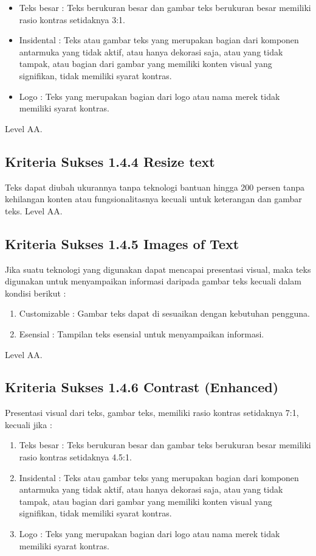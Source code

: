 \begin{itemize}
	\item Teks besar : Teks berukuran besar dan gambar teks berukuran besar memiliki rasio kontras setidaknya 3:1.
	\item Insidental : Teks atau gambar teks yang merupakan bagian dari komponen antarmuka yang tidak aktif, atau hanya dekorasi saja, atau yang tidak tampak, atau bagian dari gambar yang memiliki konten visual yang signifikan, tidak memiliki syarat kontras.
	\item Logo : Teks yang merupakan bagian dari logo atau nama merek tidak memiliki syarat kontras.
\end{itemize}

Level AA.

\subsection{Kriteria Sukses 1.4.4 Resize text}
\label{sec:kriteria_1.4.4}
Teks dapat diubah ukurannya tanpa teknologi bantuan hingga 200 persen tanpa kehilangan konten atau fungsionalitasnya kecuali untuk keterangan dan gambar teks.
Level AA.

\subsection{Kriteria Sukses 1.4.5 Images of Text}
\label{sec:kriteria_1.4.5}
Jika suatu teknologi yang digunakan dapat mencapai presentasi visual, maka teks digunakan untuk menyampaikan informasi daripada gambar teks kecuali dalam kondisi berikut :

\begin{enumerate}
	\item Customizable : Gambar teks dapat di sesuaikan dengan kebutuhan pengguna.
	\item Esensial : Tampilan teks esensial untuk menyampaikan informasi.
\end{enumerate}

Level AA.

\subsection{Kriteria Sukses 1.4.6 Contrast (Enhanced)}
\label{sec:kriteria_1.4.6}
Presentasi visual dari teks, gambar teks, memiliki rasio kontras setidaknya 7:1, kecuali jika :

\begin{enumerate}
	\item Teks besar : Teks berukuran besar dan gambar teks berukuran besar memiliki rasio kontras setidaknya 4.5:1.
	\item Insidental : Teks atau gambar teks yang merupakan bagian dari komponen antarmuka yang tidak aktif, atau hanya dekorasi saja, atau yang tidak tampak, atau bagian dari gambar yang memiliki konten visual yang signifikan, tidak memiliki syarat kontras.
	\item Logo : Teks yang merupakan bagian dari logo atau nama merek tidak memiliki syarat kontras.
\end{enumerate}

